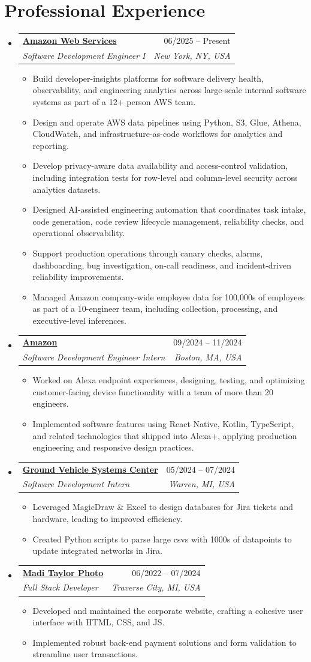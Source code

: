\documentclass[letterpaper,11pt]{article}
\makeatletter
\newcommand{\resumeItem}[1]{
  \item\small{
    {#1 \vspace{-2pt}}
  }
}
\newcommand{\resumeSubheading}[4]{
  \vspace{-2pt}\item
    \begin{tabular*}{0.97\textwidth}[t]{l@{\extracolsep{\fill}}r}
      \textbf{#1} & #2 \\
      \textit{\small#3} & \textit{\small #4} \\
    \end{tabular*}\vspace{-7pt}
}
\newcommand{\resumeSubHeadingListStart}{\begin{itemize}[leftmargin=0.15in, label={}]}
\newcommand{\resumeSubHeadingListEnd}{\end{itemize}}
\newcommand{\resumeItemListStart}{\begin{itemize}}
\newcommand{\resumeItemListEnd}{\end{itemize}\vspace{-5pt}}
\makeatother
\begin{document}
\section{Professional Experience}
    \resumeSubHeadingListStart
        \resumeSubheading
            {\href{https://aws.amazon.com}{Amazon Web Services}}{06/2025 -- Present}
            {Software Development Engineer I}{New York, NY, USA}
            \resumeItemListStart
                \resumeItem{Build developer-insights platforms for software delivery health, observability, and engineering analytics across large-scale internal software systems as part of a 12+ person AWS team.}
                \resumeItem{Design and operate AWS data pipelines using Python, S3, Glue, Athena, CloudWatch, and infrastructure-as-code workflows for analytics and reporting.}
                \resumeItem{Develop privacy-aware data availability and access-control validation, including integration tests for row-level and column-level security across analytics datasets.}
                \resumeItem{Designed AI-assisted engineering automation that coordinates task intake, code generation, code review lifecycle management, reliability checks, and operational observability.}
                \resumeItem{Support production operations through canary checks, alarms, dashboarding, bug investigation, on-call readiness, and incident-driven reliability improvements.}
                \resumeItem{Managed Amazon company-wide employee data for 100,000s of employees as part of a 10-engineer team, including collection, processing, and executive-level inferences.}
            \resumeItemListEnd
        \resumeSubheading
            {\href{https://www.amazon.com}{Amazon}}{09/2024 -- 11/2024}
            {Software Development Engineer Intern}{Boston, MA, USA}
            \resumeItemListStart
                \resumeItem{Worked on Alexa endpoint experiences, designing, testing, and optimizing customer-facing device functionality with a team of more than 20 engineers.}
                \resumeItem{Implemented software features using React Native, Kotlin, TypeScript, and related technologies that shipped into Alexa+, applying production engineering and responsive design practices.}
            \resumeItemListEnd
        \resumeSubheading
            {\href{https://gvsc.devcom.army.mil}{Ground Vehicle Systems Center}}{05/2024 -- 07/2024}
            {Software Development Intern}{Warren, MI, USA}
            \resumeItemListStart
                \resumeItem{Leveraged MagicDraw \& Excel to design databases for Jira tickets and hardware, leading to improved efficiency.}
                \resumeItem{Created Python scripts to parse large csvs with 1000s of datapoints to update integrated networks in Jira.}
            \resumeItemListEnd
        \resumeSubheading
            {\href{https://maditaylorphoto.com}{Madi Taylor Photo}}{06/2022 -- 07/2024}
            {Full Stack Developer}{Traverse City, MI, USA}
            \resumeItemListStart
                \resumeItem{Developed and maintained the corporate website, crafting a cohesive user interface with HTML, CSS, and JS.}
                \resumeItem{Implemented robust back-end payment solutions and form validation to streamline user transactions.}
            \resumeItemListEnd
    \resumeSubHeadingListEnd
\end{document}
